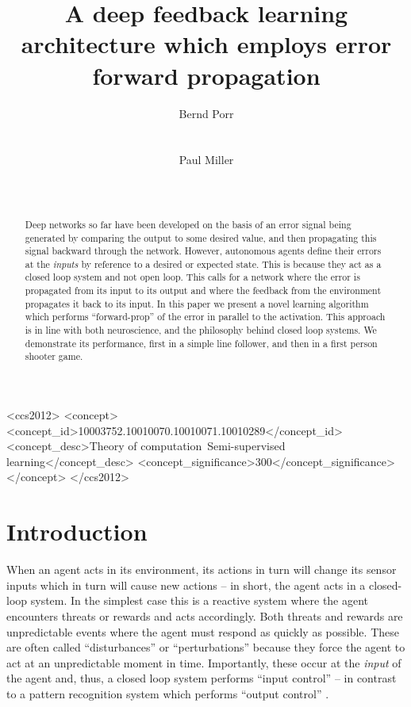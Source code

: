 \documentclass{aamas2018}
\title{A deep feedback learning architecture which employs error forward propagation}
\author{
%
\alignauthor
Bernd Porr\\
       \affaddr{Glasgow Neuro LTD}\\
       \affaddr{Glasgow, United Kingdom}\\
       \email{bernd@glasgowneuro.tech}
\alignauthor
Paul Miller\\
       \affaddr{Glasgow Neuro LTD}\\
       \affaddr{Glasgow, United Kingdom}\\
       \email{paul@glasgowneuro.tech}
}
\begin{document}
\maketitle

\begin{abstract}
  Deep networks so far have been developed on the basis of an error
  signal being generated by comparing the output to some desired
  value, and then propagating this signal backward through the
  network. However, autonomous agents define their errors at the
  \textsl{inputs} by reference to a desired or expected state. This is
  because they act as a closed loop system and not open loop. This
  calls for a network where the error is propagated from its input to
  its output and where the feedback from the environment propagates it
  back to its input. In this paper we present a novel learning
  algorithm which performs ``forward-prop'' of the error in parallel
  to the activation. This approach is in line with both neuroscience,
  and the philosophy behind closed loop systems. We demonstrate its
  performance, first in a simple line follower, and then in a first
  person shooter game.
\end{abstract}


 \begin{CCSXML}
<ccs2012>
<concept>
<concept_id>10003752.10010070.10010071.10010289</concept_id>
<concept_desc>Theory of computation~Semi-supervised learning</concept_desc>
<concept_significance>300</concept_significance>
</concept>
</ccs2012>
\end{CCSXML}



\printccsdesc





\section{Introduction}
When an agent acts in its environment, its actions in turn will change
its sensor inputs which in turn will cause new actions -- in short,
the agent acts in a closed-loop system. In the simplest case this is a
reactive system where the agent encounters threats or rewards and acts
accordingly. Both threats and rewards are unpredictable events where
the agent must respond as quickly as possible. These are often called
``disturbances'' \cite{Phillips2000} or
``perturbations'' because they force the agent to
act at an unpredictable moment in time. Importantly, these occur at
the \textsl{input} of the agent and, thus, a closed loop system
performs ``input control'' -- in contrast to a pattern recognition
system which performs ``output control''
\cite{Phillips2000,Porr2005kyb}.
\end{document}
